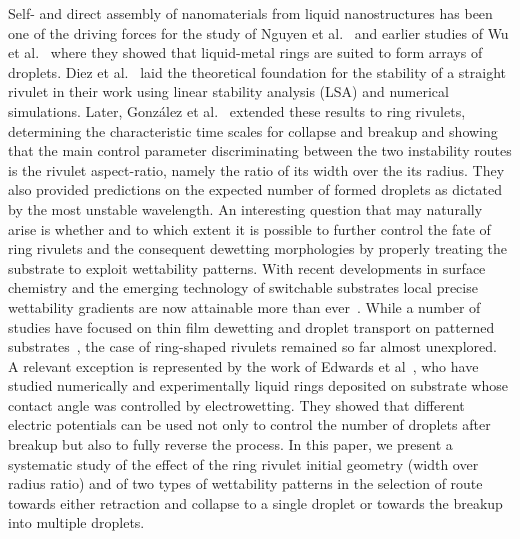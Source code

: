 \documentclass[twoside,twocolumn,9pt]{article}
\begin{document}
Self- and direct assembly of nanomaterials from liquid nanostructures has been one of the driving forces for the study of Nguyen et al.~\cite{nguyenCompetitionCollapseBreakup2012} and earlier studies of Wu et al.~\cite{wuBreakupPatternedNanoscale2010} where they showed that liquid-metal rings are suited to form arrays of droplets.
Diez et al.~\cite{diezBreakupFluidRivulets2009, diezStabilityFinitelengthRivulet2009} laid the theoretical foundation for the stability of a straight rivulet in their work using linear stability analysis (LSA) and numerical simulations. 
Later, Gonz{\'a}lez et al.~\cite{gonzalezStabilityLiquidRing2013} extended these results to ring rivulets, determining the characteristic time scales for collapse and breakup and showing that the main control parameter discriminating between the two instability routes is the rivulet aspect-ratio, namely the ratio of its width over the its radius.
They also provided predictions on the expected number of formed droplets as dictated by the most unstable wavelength.
An interesting question that may naturally arise is whether and to which extent it is possible to further control the fate of ring rivulets and the consequent dewetting morphologies by properly treating the substrate to exploit wettability patterns. 
With recent developments in surface chemistry and the emerging technology of switchable substrates local precise wettability gradients are now attainable more than ever~\cite{xinReversiblySwitchableWettability2010, stuartEmergingApplicationsStimuliresponsive2010,chenThermalresponsiveHydrogelSurface2010, ichimuraLightDrivenMotionLiquids2000, mugeleElectrowettingConvenientWay2005, edwardsControllingBreakupToroidal2021}.
While a number of studies have focused on thin film dewetting and droplet transport on patterned substrates~\cite{liuActuatingWaterDroplets2015,grawitterSteeringDropletsSubstrates2021, zitzControllingDewettingMorphologies2023}, the case of ring-shaped rivulets remained so far almost unexplored.
A relevant exception is represented by the work of Edwards et al~\cite{edwardsControllingBreakupToroidal2021}, who have studied numerically and experimentally liquid rings deposited on substrate whose contact angle was controlled by electrowetting. 
They showed that different electric potentials can be used not only to control the number of droplets after breakup but also to fully reverse the process.
In this paper, we present a systematic study of the effect of the ring rivulet initial geometry (width over radius ratio) and of two types of wettability patterns in the selection of route towards either retraction and collapse to a single droplet or towards the breakup into multiple droplets. 
\end{document}
